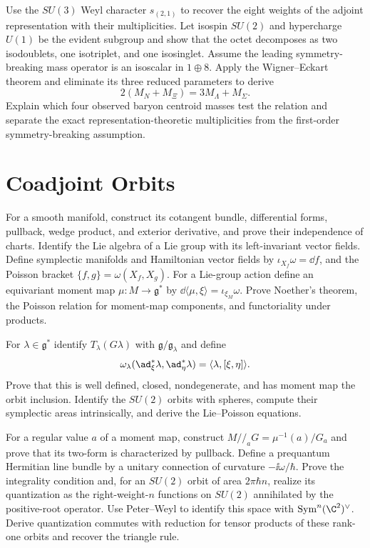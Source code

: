 \begin{exercise}
Use the $SU(3)$ Weyl character $s_{(2,1)}$ to recover the eight weights of the
adjoint representation with their multiplicities.  Let isospin $SU(2)$ and
hypercharge $U(1)$ be the evident subgroup and show that the octet decomposes
as two isodoublets, one isotriplet, and one isosinglet.  Assume the leading
symmetry-breaking mass operator is an isoscalar in $1\oplus8$.  Apply the
Wigner--Eckart theorem and eliminate its three reduced parameters to derive
\[
 2(M_N+M_\Xi)=3M_\Lambda+M_\Sigma.
\]
Explain which four observed baryon centroid masses test the relation and
separate the exact representation-theoretic multiplicities from the
first-order symmetry-breaking assumption.
\end{exercise}

\section{Coadjoint Orbits}

\begin{exercise}
For a smooth manifold, construct its cotangent bundle, differential forms,
pullback, wedge product, and exterior derivative, and prove their independence
of charts.  Identify the Lie algebra of a Lie group with its left-invariant
vector fields.  Define symplectic manifolds and
Hamiltonian vector fields by
$\iota_{X_f}\omega=\dd f$, and the Poisson bracket
$\{f,g\}=\omega(X_f,X_g)$.  For a Lie-group action define an equivariant
moment map $\mu:M\to\mathfrak g^*$ by
$\dd\langle\mu,\xi\rangle=\iota_{\xi_M}\omega$.  Prove Noether's theorem,
the Poisson relation for moment-map components, and functoriality under
products.
\end{exercise}

\begin{exercise}
For $\lambda\in\mathfrak g^*$ identify
$T_\lambda(G\lambda)$ with $\mathfrak g/\mathfrak g_\lambda$ and define
\[
 \omega_\lambda(\ad^*_\xi\lambda,\ad^*_\eta\lambda)
 =\langle\lambda,[\xi,\eta]\rangle.
\]
Prove that this is well defined, closed, nondegenerate, and has moment map the
orbit inclusion.  Identify the $SU(2)$ orbits with spheres, compute their
symplectic areas intrinsically, and derive the Lie--Poisson equations.
\end{exercise}

\begin{exercise}
For a regular value $a$ of a moment map, construct
$M//_aG=\mu^{-1}(a)/G_a$ and prove that its two-form is characterized by
pullback.  Define a prequantum Hermitian line bundle by a unitary connection
of curvature $-\ii\omega/\hbar$.  Prove the integrality condition and, for an
$SU(2)$ orbit of area $2\pi\hbar n$, realize its quantization as the
right-weight-$n$ functions on $SU(2)$ annihilated by the positive-root
operator.  Use Peter--Weyl to identify this space with
$\operatorname{Sym}^n(\C^2)^\vee$.
Derive quantization commutes with reduction for tensor products of these
rank-one orbits and recover the triangle rule.
\end{exercise}

